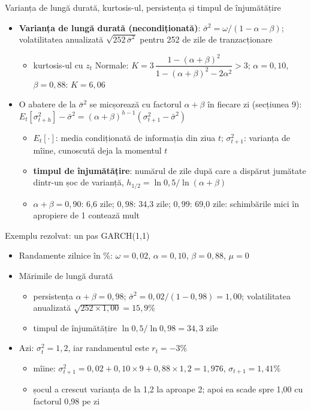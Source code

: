 \begin{frame}{Varianța de lungă durată, kurtosis-ul, persistența și timpul de înjumătățire}
\itemsize{\small}
\begin{itemize}
    \item \textbf{Varianța de lungă durată (necondiționată)}: $\bar\sigma^2 = \omega/(1 - \alpha - \beta)$; volatilitatea anualizată $\sqrt{252\,\bar\sigma^2}$ pentru 252 de zile de tranzacționare
    \begin{itemize}
        \item kurtosis-ul cu $z_t$ Normale: $K = 3\,\dfrac{1 - (\alpha + \beta)^2}{1 - (\alpha + \beta)^2 - 2\alpha^2} > 3$; $\alpha = 0{,}10$, $\beta = 0{,}88$: $K = 6{,}06$
    \end{itemize}
    \item O abatere de la $\bar\sigma^2$ se micșorează cu factorul $\alpha + \beta$ în fiecare zi (secțiunea 9): $E_t[\sigma_{t+h}^2] - \bar\sigma^2 = (\alpha + \beta)^{h-1}(\sigma_{t+1}^2 - \bar\sigma^2)$
    \begin{itemize}
        \item $E_t[\cdot]$: media condiționată de informația din ziua $t$; $\sigma_{t+1}^2$: varianța de mîine, cunoscută deja la momentul $t$
        \item \textbf{timpul de înjumătățire}: numărul de zile după care a dispărut jumătate dintr-un șoc de varianță, $h_{1/2} = \ln 0{,}5/\ln(\alpha + \beta)$
        \item $\alpha + \beta = 0{,}90$: 6{,}6 zile; $0{,}98$: 34{,}3 zile; $0{,}99$: 69{,}0 zile: schimbările mici în apropiere de 1 contează mult
    \end{itemize}
\end{itemize}
\end{frame}

\begin{frame}{Exemplu rezolvat: un pas GARCH(1,1)}
\itemsize{\small}
\begin{itemize}
    \item Randamente zilnice în \%: $\omega = 0{,}02$, $\alpha = 0{,}10$, $\beta = 0{,}88$, $\mu = 0$
    \item Mărimile de lungă durată
    \begin{itemize}
        \item persistența $\alpha + \beta = 0{,}98$; $\bar\sigma^2 = 0{,}02/(1 - 0{,}98) = 1{,}00$; volatilitatea anualizată $\sqrt{252 \times 1{,}00} = 15{,}9\%$
        \item timpul de înjumătățire $\ln 0{,}5/\ln 0{,}98 = 34{,}3$ zile
    \end{itemize}
    \item Azi: $\sigma_t^2 = 1{,}2$, iar randamentul este $r_t = -3\%$
    \begin{itemize}
        \item mîine: $\sigma_{t+1}^2 = 0{,}02 + 0{,}10 \times 9 + 0{,}88 \times 1{,}2 = 1{,}976$, $\sigma_{t+1} = 1{,}41\%$
        \item șocul a crescut varianța de la 1,2 la aproape 2; apoi ea scade spre 1{,}00 cu factorul 0{,}98 pe zi
    \end{itemize}
\end{itemize}
\end{frame}

